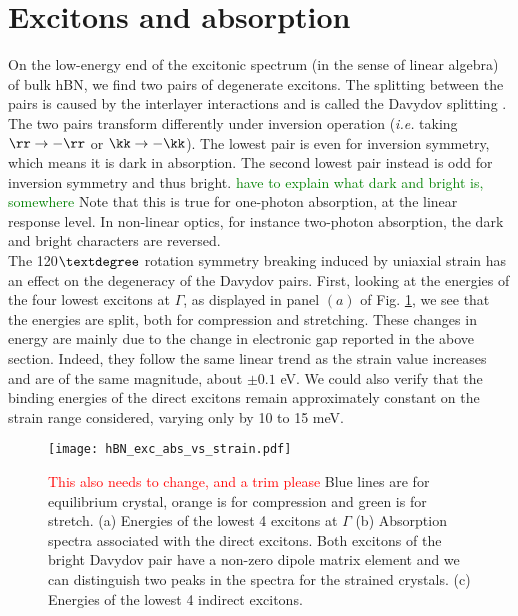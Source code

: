 %
\section{Excitons and absorption}
On the low-energy end of the excitonic spectrum (in the sense of linear algebra) of bulk \acrshort{hBN}, we find two pairs of degenerate excitons. The splitting between the pairs is caused by the interlayer interactions and is called the Davydov splitting \cite{paleari2018excitons}. The two pairs transform differently under inversion operation (\textit{i.e.} taking $\rr \to -\rr$ or $\kk \to -\kk$). The lowest pair is even for inversion symmetry, which means it is dark in absorption. The second lowest pair instead is odd for inversion symmetry and thus bright. \textcolor{green}{have to explain what dark and bright is, somewhere} Note that this is true for one-photon absorption, at the linear response level. In non-linear optics, for instance two-photon absorption, the dark and bright characters are reversed. \\
The 120$\textdegree$ rotation symmetry breaking induced by uniaxial strain has an effect on the degeneracy of the Davydov pairs. First, looking at the energies of the four lowest excitons at $\Gamma$, as displayed in panel $(a)$ of Fig. \ref{fig:exc_abs_vs_strain}, we see that the energies are split, both for compression and stretching. 
These changes in energy are mainly due to the change in electronic gap reported in the above section. Indeed, they follow the same linear trend as the strain value increases and are of the same magnitude, about $\pm 0.1$ eV. We could also verify that the binding energies of the direct excitons remain approximately constant on the strain range considered, varying only by 10 to 15 meV.
\begin{figure}[h!tbp]
	\vspace{0.2cm}
	\setcapindent{2em}
	\centering
	\texttt{[image: hBN\_exc\_abs\_vs\_strain.pdf]}
	\caption{\textcolor{red}{This also needs to change, and a trim please} Blue lines are for equilibrium crystal, orange is for compression and green is for stretch. (a) Energies of the lowest 4 excitons at $\Gamma$ (b) Absorption spectra associated with the direct excitons. Both excitons of the bright Davydov pair have a non-zero dipole matrix element and we can distinguish two peaks in the spectra for the strained crystals. (c) Energies of the lowest 4 indirect excitons.}
	\label{fig:exc_abs_vs_strain}
\end{figure}

